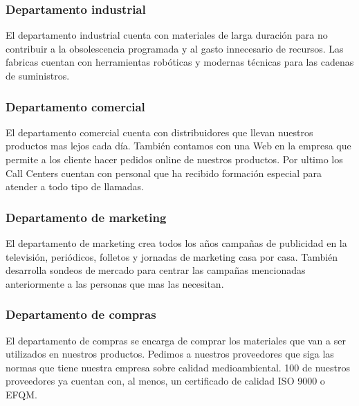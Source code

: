 \documentclass[twoside]{article}
\begin{document}
\subsubsection{Departamento industrial}
El departamento industrial cuenta con materiales de larga duración para no contribuir a la obsolescencia programada y al gasto innecesario de recursos. Las fabricas cuentan con herramientas robóticas y modernas técnicas para las cadenas de suministros.
\subsubsection{Departamento comercial}
El departamento comercial cuenta con distribuidores que llevan nuestros productos mas lejos cada día. También contamos con una Web en la empresa que permite a los cliente hacer pedidos online de nuestros productos. Por ultimo los Call Centers cuentan con personal que ha recibido formación especial para atender a todo tipo de llamadas.
\subsubsection{Departamento de marketing}
El departamento de marketing crea todos los años campañas de publicidad en la televisión, periódicos, folletos y jornadas de marketing casa por casa. También desarrolla sondeos de mercado para centrar las campañas mencionadas anteriormente a las personas que mas las necesitan.
\subsubsection{Departamento de compras}
El departamento de compras se encarga de comprar los materiales que van a ser utilizados en nuestros productos. Pedimos a nuestros proveedores que siga las normas que tiene nuestra empresa sobre calidad medioambiental. 100 de nuestros proveedores ya cuentan con, al menos, un certificado de calidad ISO 9000 o EFQM.
\end{document}
